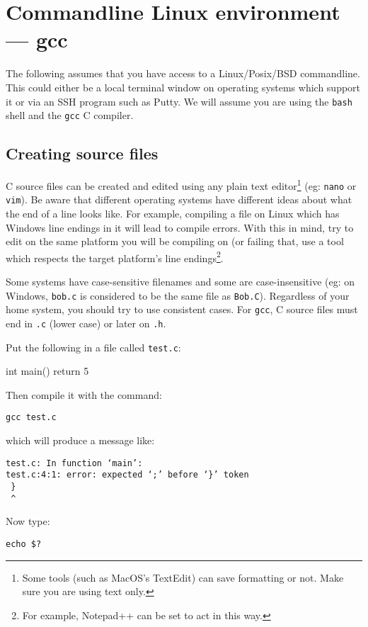 
\chapter{Commandline Linux environment --- gcc}

The following assumes that you have access to a Linux/Posix/BSD commandline.
This could either be a local terminal window on operating systems which support it or via an SSH program such as Putty.
We will assume you are using the \texttt{bash} shell and the \texttt{gcc} C compiler.

\section{Creating source files}
C source files can be created and edited using any plain text editor\footnote{Some tools (such as MacOS's TextEdit) can save formatting or not. Make sure you are using text only.} (eg: \texttt{nano} or \texttt{vim}).
Be aware that different operating systems have different ideas about what the end of a line looks like.
For example, compiling a file on Linux which has Windows line endings in it will lead to compile errors.
With this in mind, try to edit on the same platform you will be compiling on (or failing that, use a tool which respects the target
platform's line endings\footnote{For example, Notepad++ can be set to act in this way.}.

Some systems have case-sensitive filenames and some are case-insensitive (eg: on Windows, \texttt{bob.c} is considered to be the same file as \texttt{Bob.C}).
Regardless of your home system, you should try to use consistent cases.
For \texttt{gcc}, C source files must end in \texttt{.c} (lower case) or later on \texttt{.h}.

Put the following in a file called \texttt{test.c}:
\begin{codeblock}
int main()
{
    return 5
}
\end{codeblock}

Then compile it with the command:
\begin{verbatim}
gcc test.c 
\end{verbatim}
which will produce a message like:
\begin{verbatim}
test.c: In function ‘main’:
test.c:4:1: error: expected ‘;’ before ‘}’ token
 }
 ^
\end{verbatim}

Now type:
\begin{verbatim}
echo $? 
\end{verbatim}

